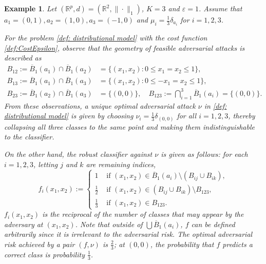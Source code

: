 \documentclass{amsart}
\theoremstyle{plain}
\numberwithin{equation}{section}\newtheorem{theorem}{Theorem}[section]
\newtheorem{example}[theorem]{Example}
\theoremstyle{remark}
\begin{document}
\begin{example}\label{example: counter example}
\normalfont
Let $(\mathbb{R}^p,d)= (\mathbb{R}^2, \| \cdot \|_1)$, $K=3$ and $\varepsilon=1$. Assume that $a_1 = (0,1), a_2=(1,0), a_3=(-1,0)$ and $\mu_i=\frac{1}{3} \delta_{a_i}$ for $i=1,2,3$. 

For the problem \eqref{def: distributional model} with the cost function \eqref{def:CostEpsilon}, observe that the geometry of feasible adversarial attacks is described as
\begin{align*}
    B_{12}:=\overline{B}_1(a_1) \cap \overline{B}_1(a_2) &= \{(x_1, x_2) : 0 \leq x_1=x_2 \leq 1 \},\\
    B_{13}:=\overline{B}_1(a_1) \cap \overline{B}_1(a_3) &= \{(x_1, x_2) : 0 \leq -x_1=x_2 \leq 1 \},\\
    B_{23}:=\overline{B}_1(a_2) \cap \overline{B}_1(a_3) &= \{(0,0) \}, \quad B_{123}:=\bigcap_{i=1}^3 \overline{B}_1(a_i) = \{(0,0)\}.
\end{align*}
From these observations, a unique optimal adversarial attack $\nu$ in \eqref{def: distributional model} is given by choosing $\nu_i = \frac{1}{3} \delta_{(0,0)}$ for all $i=1,2,3$, thereby collapsing all three classes to the same point and making them indistinguishable to the classifier.

On the other hand, the robust classifier against $\nu$ is given as follows: for each $i=1,2,3$, letting $j$ and $k$ are remaining indices,
\[
    f_i(x_1, x_2) :=
\begin{cases}
    1 &\text{ if $(x_1, x_2) \in \overline{B}_1(a_i) \setminus (B_{ij} \cup B_{ik})$},\\
    \frac{1}{2} &\text{ if $(x_1, x_2) \in (B_{ij} \cup B_{ik}) \setminus B_{123}$},\\
    \frac{1}{3} &\text{ if $(x_1, x_2) \in B_{123}$}.
\end{cases}
\]
$f_i(x_1, x_2)$ is the reciprocal of the number of classes that may appear by the adversary at $(x_1, x_2)$. %
Note that outside of $\bigcup \overline{B}_1(a_i)$, $f$ can be defined arbitrarily since it is irrelevant to the adversarial risk. The optimal adversarial risk achieved by a pair $(f,\nu)$ is $\frac{2}{3}$; at $(0,0)$, the probability that $f$ predicts a correct class is probability $\frac{1}{3}$.






\end{example}
\end{document}
